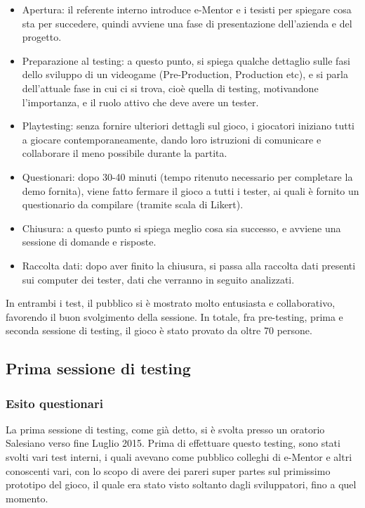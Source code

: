 \begin{itemize}

\item Apertura: il referente interno introduce e-Mentor e i tesisti per spiegare cosa sta per succedere, quindi avviene una fase di presentazione dell'azienda e del progetto.
\item Preparazione al testing: a questo punto, si spiega qualche dettaglio sulle fasi dello sviluppo di un videogame (Pre-Production, Production etc), e si parla dell'attuale fase in cui ci si trova, cioè quella di testing, motivandone l'importanza, e il ruolo attivo che deve avere un tester.
\item Playtesting: senza fornire ulteriori dettagli sul gioco, i giocatori iniziano tutti a giocare contemporaneamente, dando loro istruzioni di comunicare e collaborare il meno possibile durante la partita.
\item Questionari: dopo 30-40 minuti (tempo ritenuto necessario per completare la demo fornita), viene fatto fermare il gioco a tutti i tester, ai quali è fornito un questionario da compilare (tramite scala di Likert).
\item Chiusura: a questo punto si spiega meglio cosa sia successo, e avviene una sessione di domande e risposte.
\item Raccolta dati: dopo aver finito la chiusura, si passa alla raccolta dati presenti sui computer dei tester, dati che verranno in seguito analizzati.

\end{itemize}

In entrambi i test, il pubblico si è mostrato molto entusiasta e collaborativo, favorendo il buon svolgimento della sessione. In totale, fra pre-testing, prima e seconda sessione di testing, il gioco è stato provato da oltre 70 persone.


\newpage


\subsection{Prima sessione di testing}
\label{sec:testing_primo_test}

\subsubsection{Esito questionari}

La prima sessione di testing, come già detto, si è svolta presso un oratorio Salesiano verso fine Luglio 2015. Prima di effettuare questo testing, sono stati svolti vari test interni, i quali avevano come pubblico colleghi di e-Mentor e altri conoscenti vari, con lo scopo di avere dei pareri super partes sul primissimo prototipo del gioco, il quale era stato visto soltanto dagli sviluppatori, fino a quel momento. 

